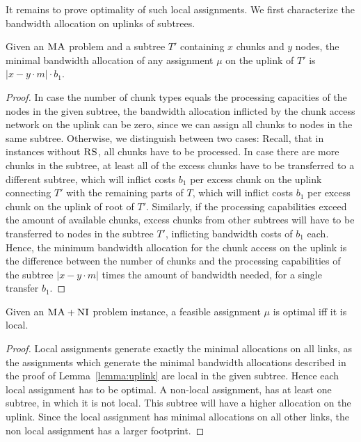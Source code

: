 \documentclass[preprint,12pt]{elsarticle}
\newcommand{\MaFactor}{m}
\newcommand{\VmChunkAssignment}{\mu}
\newcommand{\CC}{\textsc{NI}}
\newcommand{\RS}{\textsc{RS}}
\newcommand{\MA}{\textsc{MA}}
\newcommand{\Tree}{\ensuremath{T}}
\newcommand{\CostTrans}{\ensuremath{b_1}}
\begin{document}
It remains to prove optimality of such local assignments.
We first characterize the bandwidth allocation on uplinks of subtrees.
\begin{lemma}\label{lem:uplink-alloc}
Given an $\MA$ problem and a subtree $\Tree'$
containing $x$
chunks and $y$ nodes, the minimal bandwidth allocation of any
assignment
$\VmChunkAssignment$ on the uplink of $\Tree'$ is $|x-y\cdot\MaFactor|\cdot
\CostTrans$.
\label{lemma:uplink}
\end{lemma}
\begin{proof}
In case the number of chunk types equals the processing capacities of the
nodes in the given subtree,
the bandwidth allocation inflicted by the chunk access network on the uplink can
be
zero, since we can assign all chunks to nodes in the same subtree.
Otherwise, we distinguish between two cases: Recall, that in instances
without $\RS$, all chunks have to be processed. In case
there are more chunks in the subtree, at least all of the excess chunks have to
be transferred to a different subtree, which will
inflict costs $\CostTrans$ per excess chunk on the uplink connecting $\Tree'$
with the
remaining parts of $\Tree$, which will inflict costs $\CostTrans$ per excess chunk on the uplink of root of $\Tree'$.
 Similarly, if the processing capabilities exceed the
amount of
available chunks, excess chunks from other subtrees will have to be transferred
to
nodes in the subtree $\Tree'$, inflicting bandwidth costs of $\CostTrans$ each.
Hence, the minimum bandwidth allocation for the chunk access on the uplink
is the difference between the number of chunks and the processing capabilities
of the subtree $|x-y\cdot\MaFactor|$ times the amount of bandwidth needed,
for a single transfer $\CostTrans$.
\end{proof}


\begin{theorem}
Given an $\MA+\CC$ problem instance, a feasible assignment $\VmChunkAssignment$
is optimal iff it is local.
\label{thm:local_optimal}
\end{theorem}

\begin{proof}
Local assignments generate exactly the minimal allocations on all links, as
 the assignments which generate the minimal bandwidth allocations
described in
the proof of
Lemma~\ref{lemma:uplink} are local in the given subtree. Hence
each local assignment has to be optimal. A non-local assignment, has at least
one subtree, in which it is not local. This subtree will have a higher
allocation on the uplink. Since the local assignment has minimal allocations
on all other links, the non local assignment has a larger footprint.
\end{proof}
\end{document}
